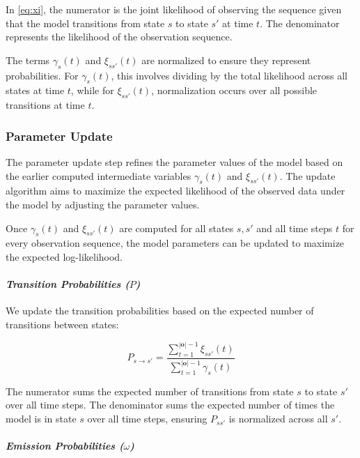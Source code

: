 In \autoref{eq:xi}, the numerator is the joint likelihood of observing the sequence given that the model transitions from state $s$ to state $s'$ at time $t$.
The denominator represents the likelihood of the observation sequence.


The terms $\gamma_s(t)$ and $\xi_{ss'}(t)$ are normalized to ensure they represent probabilities.
For $\gamma_s(t)$, this involves dividing by the total likelihood across all states at time $t$, while for $\xi_{ss'}(t)$, normalization occurs over all possible transitions at time $t$.

\subsubsection{Parameter Update}
The parameter update step refines the parameter values of the model based on the earlier computed intermediate variables $\gamma_s(t)$ and $\xi_{ss'}(t)$.
The update algorithm aims to maximize the expected likelihood of the observed data under the model by adjusting the parameter values.

Once $\gamma_s(t)$ and $\xi_{ss'}(t)$ are computed for all states $s, s'$ and all time steps $t$ for every observation sequence, the model parameters can be updated to maximize the expected log-likelihood.

\paragraph*{\textit{Transition Probabilities ($P$)}}

We update the transition probabilities based on the expected number of transitions between states:


\begin{equation}
    P_{s \rightarrow s'} = \frac{\sum_{t = 1}^{|\mathbf{o}|-1} \xi_{ss'}(t)}{\sum_{t = 1}^{|\mathbf{o}|-1} \gamma_s(t)}
    \label{eq:transition-probabilities}
\end{equation}


The numerator sums the expected number of transitions from state $s$ to state $s'$ over all time steps.
The denominator sums the expected number of times the model is in state $s$ over all time steps, ensuring $P_{ss'}$ is normalized across all $s'$.

\paragraph*{\textit{Emission Probabilities ($\omega$)}}

